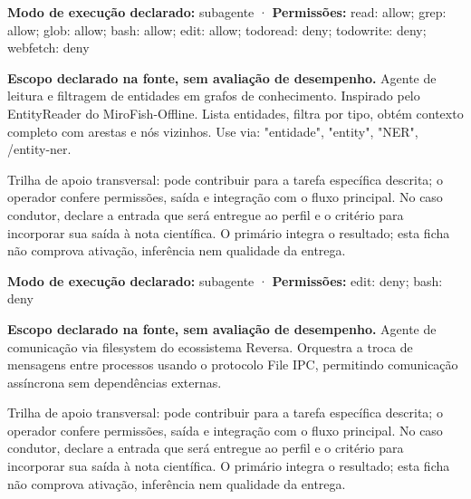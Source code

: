 \begin{arquitetura}
\textbf{Modo de execução declarado:} subagente · \textbf{Permissões:} read: allow; grep: allow; glob: allow; bash: allow; edit: allow; todoread: deny; todowrite: deny; webfetch: deny
\end{arquitetura}


\begin{descricao}
\textbf{Escopo declarado na fonte, sem avaliação de desempenho.}
Agente de leitura e filtragem de entidades em grafos de conhecimento. Inspirado pelo EntityReader do MiroFish-Offline. Lista entidades, filtra por tipo, obtém contexto completo com arestas e nós vizinhos. Use via: "entidade", "entity", "NER", /entity-ner.
\end{descricao}

\begin{funcao}
Trilha de apoio transversal: pode contribuir para a tarefa específica descrita; o operador confere permissões, saída e integração com o fluxo principal. No caso condutor, declare a entrada que será entregue ao perfil e o critério para incorporar sua saída à nota científica. O primário integra o resultado; esta ficha não comprova ativação, inferência nem qualidade da entrega.
\end{funcao}

\begin{arquitetura}
\textbf{Modo de execução declarado:} subagente · \textbf{Permissões:} edit: deny; bash: deny
\end{arquitetura}


\begin{descricao}
\textbf{Escopo declarado na fonte, sem avaliação de desempenho.}
Agente de comunicação via filesystem do ecossistema Reversa. Orquestra a troca de mensagens entre processos usando o protocolo File IPC, permitindo comunicação assíncrona sem dependências externas.
\end{descricao}

\begin{funcao}
Trilha de apoio transversal: pode contribuir para a tarefa específica descrita; o operador confere permissões, saída e integração com o fluxo principal. No caso condutor, declare a entrada que será entregue ao perfil e o critério para incorporar sua saída à nota científica. O primário integra o resultado; esta ficha não comprova ativação, inferência nem qualidade da entrega.
\end{funcao}

